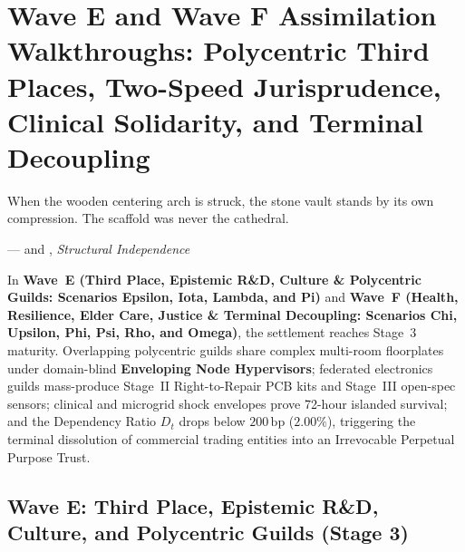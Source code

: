 \chapter{Wave E and Wave F Assimilation Walkthroughs: Polycentric Third Places, Two-Speed Jurisprudence, Clinical Solidarity, and Terminal Decoupling}
\label{ch:l7-waves-e-and-f}

\epigraph{When the wooden centering arch is struck, the stone vault stands by its own compression. The scaffold was never the cathedral.}{---\textcite{brand1994buildings} and \textcite{alexander1977pattern}, \textit{Structural Independence}}

In \textbf{Wave~E (Third Place, Epistemic R\&D, Culture \& Polycentric Guilds: Scenarios Epsilon, Iota, Lambda, and Pi)} and \textbf{Wave~F (Health, Resilience, Elder Care, Justice \& Terminal Decoupling: Scenarios Chi, Upsilon, Phi, Psi, Rho, and Omega)}, the settlement reaches Stage~3 maturity. Overlapping polycentric guilds share complex multi-room floorplates under domain-blind \textbf{Enveloping Node Hypervisors}; federated electronics guilds mass-produce Stage~II Right-to-Repair PCB kits and Stage~III open-spec sensors; clinical and microgrid shock envelopes prove 72-hour islanded survival; and the Dependency Ratio $D_t$ drops below $200\,\mathrm{bp}$ ($2.00\%$), triggering the terminal dissolution of commercial trading entities into an Irrevocable Perpetual Purpose Trust.

\section{Wave E: Third Place, Epistemic R\&D, Culture, and Polycentric Guilds (Stage 3)}
\label{sec:l7-wave-e}

